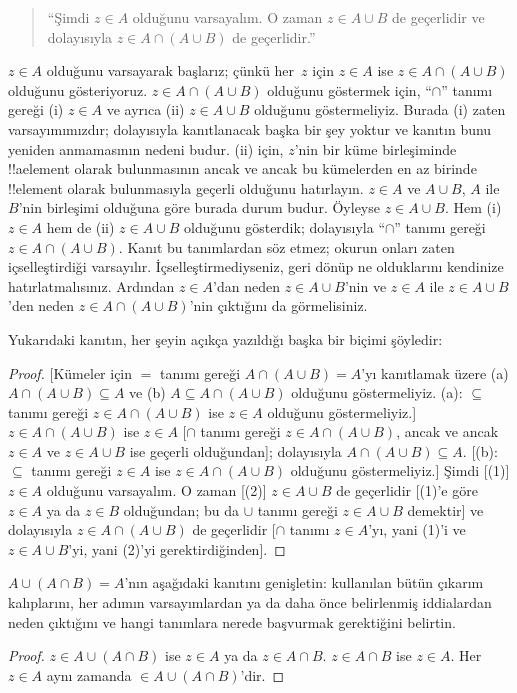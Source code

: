 \documentclass[../../../include/open-logic-section]{subfiles}
\begin{document}
\begin{quote}
``Şimdi $z \in A$ olduğunu varsayalım. O zaman $z \in A \cup B$ de
geçerlidir ve dolayısıyla $z \in A \cap (A \cup B)$ de geçerlidir.''
\end{quote}

$z \in A$ olduğunu varsayarak başlarız; çünkü her~$z$ için $z \in A$
ise $z \in A \cap (A \cup B)$ olduğunu gösteriyoruz. $z \in A
\cap (A \cup B)$ olduğunu göstermek için, ``$\cap$'' tanımı gereği (i)
$z \in A$ ve ayrıca (ii) $z \in A \cup B$ olduğunu göstermeliyiz.
Burada (i) zaten varsayımımızdır; dolayısıyla kanıtlanacak başka bir
şey yoktur ve kanıtın bunu yeniden anmamasının nedeni budur. (ii) için,
$z$'nin bir küme birleşiminde !!a{element} olarak bulunmasının ancak ve ancak bu
kümelerden en az birinde !!{element} olarak bulunmasıyla geçerli olduğunu
hatırlayın. $z \in A$ ve $A \cup B$, $A$ ile $B$'nin birleşimi olduğuna
göre burada durum budur. Öyleyse $z \in A \cup B$. Hem (i) $z \in A$
hem de (ii) $z \in A \cup B$ olduğunu gösterdik; dolayısıyla ``$\cap$''
tanımı gereği $z \in A \cap (A \cup B)$. Kanıt bu tanımlardan söz etmez;
okurun onları zaten içselleştirdiği varsayılır. İçselleştirmediyseniz,
geri dönüp ne olduklarını kendinize hatırlatmalısınız. Ardından $z \in
A$'dan neden $z \in A \cup B$'nin ve $z \in A$ ile $z \in A \cup B$'den
neden $z \in A \cap (A \cup B)$'nin çıktığını da görmelisiniz.

Yukarıdaki kanıtın, her şeyin açıkça yazıldığı başka bir biçimi şöyledir:
\begin{proof}{}
[Kümeler için $=$ tanımı gereği $A \cap (A \cup B) = A$'yı kanıtlamak
  üzere (a) $A \cap (A \cup B) \subseteq A$ ve (b) $A \subseteq A \cap
  (A \cup B)$ olduğunu göstermeliyiz. (a): $\subseteq$ tanımı gereği $z
  \in A \cap (A \cup B)$ ise $z \in A$ olduğunu göstermeliyiz.] $z \in
A \cap (A \cup B)$ ise $z \in A$ [$\cap$ tanımı gereği $z \in A \cap
  (A \cup B)$, ancak ve ancak $z \in A$ ve $z \in A \cup B$ ise
  geçerli olduğundan]; dolayısıyla $A \cap (A \cup B) \subseteq A$.
[(b): $\subseteq$ tanımı gereği $z \in A$ ise $z \in A \cap (A \cup
  B)$ olduğunu göstermeliyiz.] Şimdi [(1)] $z \in A$ olduğunu
varsayalım. O zaman [(2)] $z \in A \cup B$ de geçerlidir [(1)'e göre
  $z \in A$ ya da $z \in B$ olduğundan; bu da $\cup$ tanımı gereği $z
  \in A \cup B$ demektir] ve dolayısıyla $z \in A \cap (A \cup B)$ de
geçerlidir [$\cap$ tanımı $z \in A$'yı, yani (1)'i ve $z \in A \cup B$'yi,
  yani (2)'yi gerektirdiğinden].
\end{proof}

\begin{prob}
$A \cup (A \cap B) = A$'nın aşağıdaki kanıtını genişletin: kullanılan
bütün çıkarım kalıplarını, her adımın varsayımlardan ya da daha önce
belirlenmiş iddialardan neden çıktığını ve hangi tanımlara nerede
başvurmak gerektiğini belirtin.
\begin{proof}
  $z \in A \cup (A \cap B)$ ise $z \in A$ ya da $z \in A \cap B$. $z
  \in A \cap B$ ise $z \in A$. Her $z \in A$ aynı zamanda $\in A \cup
  (A \cap B)$'dir.
\end{proof}
\end{prob}
\end{document}
